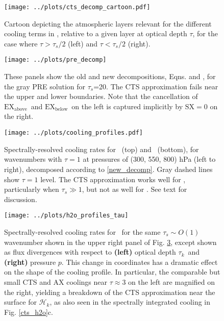 \documentclass[10pt]{article}
\newcommand{\ch}{\ensuremath{\mathcal{H}}}
\newcommand{\chk}{\ensuremath{\ch_k}}
\newcommand{\tauk}{\ensuremath{\tau_k}}
\newcommand{\taus}{\ensuremath{\tau_s}}
\newcommand{\SX}{\ensuremath{\mathrm{SX}}}
\newcommand{\EXbelow}{\ensuremath{\mathrm{EX_{below}}}}
\newcommand{\EXabove}{\ensuremath{\mathrm{EX_{above}}}}
\begin{document}
\begin{figure}[h!]
	\begin{center}
			\texttt{[image: ../plots/cts\_decomp\_cartoon.pdf]}
		\caption{Cartoon depicting the atmospheric layers relevant for the different cooling terms in , relative to a given layer at optical depth $\tau$, for the case where $\tau > \taus/2$ (left) and $\tau<\taus/2$ (right).
		\label{decomp_cartoon}
		}
	\end{center}
\end{figure}

\begin{figure}[h]
	\begin{center}
			\texttt{[image: ../plots/pre\_decomp]}
		\caption{These panels show the old and new decompositions, Eqns.   and  , for the gray PRE solution  for \taus=20. The CTS approximation  fails near the upper and lower boundaries. Note that the cancellation of \EXabove\ and \EXbelow\ on the left is captured implicitly by $\SX=0$ on the right.  
		\label{pre_decomp}
		}
	\end{center}
\end{figure}

\begin{figure}[h]
	\begin{center}
			\texttt{[image: ../plots/cooling\_profiles.pdf]}
		\caption{Spectrally-resolved cooling rates for \htwo\ (top) and \cotwo\ (bottom), for  wavenumbers with $\tau=1$ at pressures of (300, 550, 800) hPa (left to right), decomposed according to  \eqref{new_decomp}. Gray dashed lines show $\tau=1$ level. The CTS approximation works well for \htwo, particularly when $\taus \gg 1$,  but not as well for \cotwo. See text for discussion.
		\label{cooling_profiles}
		}
	\end{center}
\end{figure}

\begin{figure}[h]
	\begin{center}
			\texttt{[image: ../plots/h2o\_profiles\_tau]}
		\caption{Spectrally-resolved cooling rates for \htwo\ for the same $\taus \sim O(1)$ wavenumber shown in the upper right panel of Fig. \ref{cooling_profiles}, except shown as flux divergences with respect to \textbf{(left)}  optical depth \tauk\  and \textbf{(right)} pressure $p$. This change in coordinates has a dramatic effect on the shape of the cooling profile. In particular, the comparable but small CTS and AX coolings near $\tau \approx 3$ on the left are magnified on the right, yielding a breakdown of the CTS approximation near the surface for \chk, as also seen in the spectrally integrated cooling in Fig. \ref{cts_h2o}c.
		\label{h2o_profiles_tau}
		}
	\end{center}
\end{figure}
\end{document}
